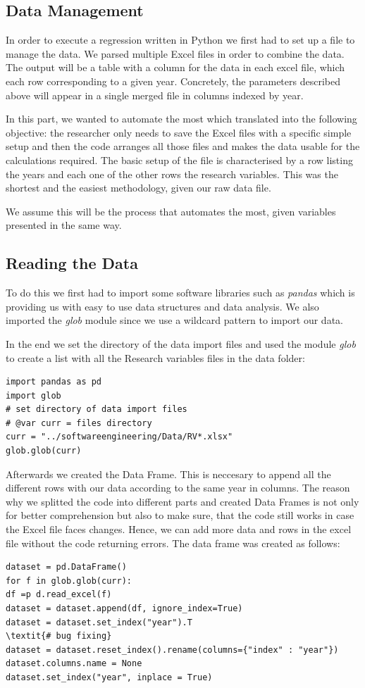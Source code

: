 \documentclass[12pt,a4paper,bibliography=totocnumbered,listof=totocnumbered]{scrartcl}
\begin{document}
\subsection{Data Management}
In order to execute a regression written in Python we first had to set up a file to manage the data. We parsed multiple Excel files in order to combine the data. The output will be a table with a column for the data in each excel file, which each row corresponding to a given year. Concretely, the parameters described above will appear in a single merged file in columns indexed by year. 

In this part, we wanted to automate the most which translated into the following objective: the researcher only needs to save the Excel files with a specific simple setup and then the code arranges all those files and makes the data usable for the calculations required. The basic setup of the file is characterised by a row listing the years and each one of the other rows the research variables. This was the shortest and the easiest methodology, given our raw data file. 

We assume this will be the process that automates the most, given variables presented in the same way.
\\      
\subsection{Reading the Data}

To do this we first had to import some software libraries such as \textit{pandas} which is providing us with easy to use data structures and data analysis. We also imported the \textit{glob} module since we use a wildcard pattern to import our data. 

In the end we set the directory of the data import files and used the module \textit{glob} to create a list with all the Research variables files in the data folder:

\begin{verbatim}
import pandas as pd
import glob
# set directory of data import files
# @var curr = files directory
curr = "../softwareengineering/Data/RV*.xlsx"
glob.glob(curr)
\end{verbatim}


Afterwards we created the Data Frame. This is neccesary to append all the different rows with our data according to the same year in columns. The reason why we splitted the code into different parts and created Data Frames is not only for better comprehension but also to make sure, that the code still works in case the Excel file faces changes. Hence, we can add more data and rows in the excel file without the code returning errors. The data frame was created as follows:
\begin{verbatim}
dataset = pd.DataFrame()
for f in glob.glob(curr):
df =p d.read_excel(f)
dataset = dataset.append(df, ignore_index=True)
dataset = dataset.set_index("year").T
\textit{# bug fixing}
dataset = dataset.reset_index().rename(columns={"index" : "year"})
dataset.columns.name = None
dataset.set_index("year", inplace = True)
\end{verbatim}
\end{document}
